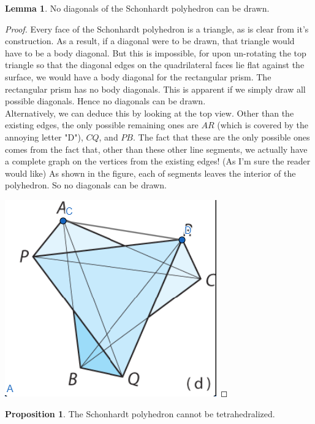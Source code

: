 \documentclass[12pt]{article}
\theoremstyle{definition}
\newtheorem{lemma}{Lemma}
\newtheorem{proposition}{Proposition}
\begin{document}
\begin{lemma}
No diagonals of the Schonhardt polyhedron can be drawn. 
\end{lemma}
\begin{proof}
Every face of the Schonhardt polyhedron is a triangle, as is clear from it's construction. As a result, if a diagonal were to be drawn, that triangle would have to be a body diagonal. But this is impossible, for upon un-rotating the top triangle so that the diagonal edges on the quadrilateral faces lie flat against the surface, we would have a body diagonal for the rectangular prism. The rectangular prism has no body diagonals. This is apparent if we simply draw all possible diagonals. Hence no diagonals can be drawn. \\

Alternatively, we can deduce this by looking at the top view. Other than the existing edges, the only possible remaining ones are $AR$ (which is covered by the annoying letter "D"), $CQ$, and $PB$. The fact that these are the only possible ones comes from the fact that, other than these other line segments, we actually have a complete graph on the vertices from the existing edges! (As I'm sure the reader would like) As shown in the figure, each of segments leaves the interior of the polyhedron. So no diagonals can be drawn.


 \includegraphics[scale=1]{attempteddiagonal.png} 
\end{proof}

\begin{proposition}
The Schonhardt polyhedron cannot be tetrahedralized.
\end{proposition}
\end{document}
